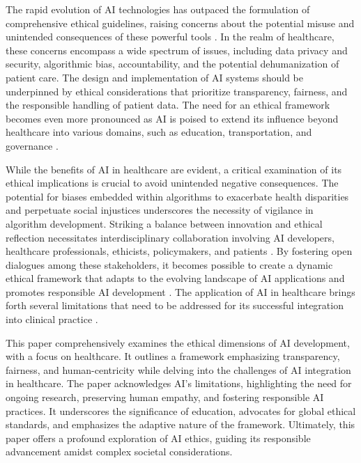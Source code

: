 \documentclass{article}
\begin{document}
The rapid evolution of AI technologies has outpaced the formulation of comprehensive ethical guidelines, raising concerns about the potential misuse and unintended consequences of these powerful tools \cite{o2019legal, eitel2021beyond}. In the realm of healthcare, these concerns encompass a wide spectrum of issues, including data privacy and security, algorithmic bias, accountability, and the potential dehumanization of patient care. The design and implementation of AI systems should be underpinned by ethical considerations that prioritize transparency, fairness, and the responsible handling of patient data. The need for an ethical framework becomes even more pronounced as AI is poised to extend its influence beyond healthcare into various domains, such as education, transportation, and governance \cite{peters2020responsible}.

While the benefits of AI in healthcare are evident, a critical examination of its ethical implications is crucial to avoid unintended negative consequences. The potential for biases embedded within algorithms to exacerbate health disparities and perpetuate social injustices underscores the necessity of vigilance in algorithm development. Striking a balance between innovation and ethical reflection necessitates interdisciplinary collaboration involving AI developers, healthcare professionals, ethicists, policymakers, and patients \cite{morley2020ethically}. By fostering open dialogues among these stakeholders, it becomes possible to create a dynamic ethical framework that adapts to the evolving landscape of AI applications and promotes responsible AI development \cite{naik2022legal}. The application of AI in healthcare brings forth several limitations that need to be addressed for its successful integration into clinical practice \cite{rasheed2022explainable}. 

This paper comprehensively examines the ethical dimensions of AI development, with a focus on healthcare. It outlines a framework emphasizing transparency, fairness, and human-centricity while delving into the challenges of AI integration in healthcare. The paper acknowledges AI's limitations, highlighting the need for ongoing research, preserving human empathy, and fostering responsible AI practices. It underscores the significance of education, advocates for global ethical standards, and emphasizes the adaptive nature of the framework. Ultimately, this paper offers a profound exploration of AI ethics, guiding its responsible advancement amidst complex societal considerations.
\end{document}
